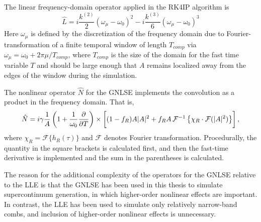The linear frequency-domain operator applied in the RK4IP algorithm is
\begin{equation}
\hat{L}=i\frac{k^{(2)}}{2}(\omega_\mu-\omega_0)^2-i\frac{k^{(3)}}{6}(\omega_\mu-\omega_0)^3
\end{equation}
Here $\omega_\mu$ is defined by the discretization of the frequency domain due to Fourier-transformation of a finite temporal window of length $T_{comp}$ via $\omega_\mu=\omega_0+2\pi\mu/T_{comp}$, where $T_{comp}$ is the size of the domain for the fast time variable $T$ and should be large enough that $A$ remains localized away from the edges of the window during the simulation.

The nonlinear operator $\hat{N}$ for the GNLSE implements the convolution as a product in the frequency domain. That is, 
\begin{equation}
\hat{N}=i\gamma\frac{1}{A}\left(1+\frac{1}{\omega_0}\frac{\partial}{\partial T}\right)\times\left[\vphantom{\frac{\partial}{\partial T}}(1-f_R)A|A|^2+f_R A\, \mathcal{F}^{-1}\left\{\chi_R\cdot\mathcal{F}(|A|^2)\right\}\right],
\end{equation}
where $\chi_R=\mathcal{F}\{h_R(\tau)\}$ and $\mathcal{F}$ denotes Fourier transformation. Procedurally, the quantity in the square brackets is calculated first, and then the fast-time derivative is implemented and the sum in the parentheses is calculated.

The reason for the additional complexity of the operators for the GNLSE relative to the LLE is that the GNLSE has been used in this thesis to simulate supercontinuum generation, in which higher-order nonlinear effects are important. In contrast, the LLE has been used to simulate only relatively narrow-band combs, and inclusion of higher-order nonlinear effects is unnecessary.

